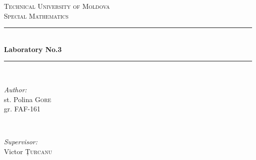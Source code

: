 \documentclass{article}
\begin{document}
  \begin{titlepage}

    \newcommand{\HRule}{\rule{\linewidth}{0.5mm}} %

    \center %


    \textsc{\LARGE Technical University of Moldova}\\[1.5cm]
    \textsc{\Large Special Mathematics}\\[0.5cm] %


    \HRule \\[0.4cm]
    { \huge \bfseries Laboratory No.3}\\[0.4cm] %
    \HRule \\[1.5cm]


    \begin{minipage}{0.4\textwidth}
      \begin{flushleft} \large
        \emph{Author:}\\
          st. Polina \textsc{Gore}\\ gr. FAF-161 %
      \end{flushleft}
    \end{minipage}
~
    \begin{minipage}{0.4\textwidth}
      \begin{flushright} \large
        \emph{Supervisor:} \\
        Victor \textsc{Țurcanu} %
      \end{flushright}
    \end{minipage}\\[2cm]



\end{titlepage}
\end{document}
